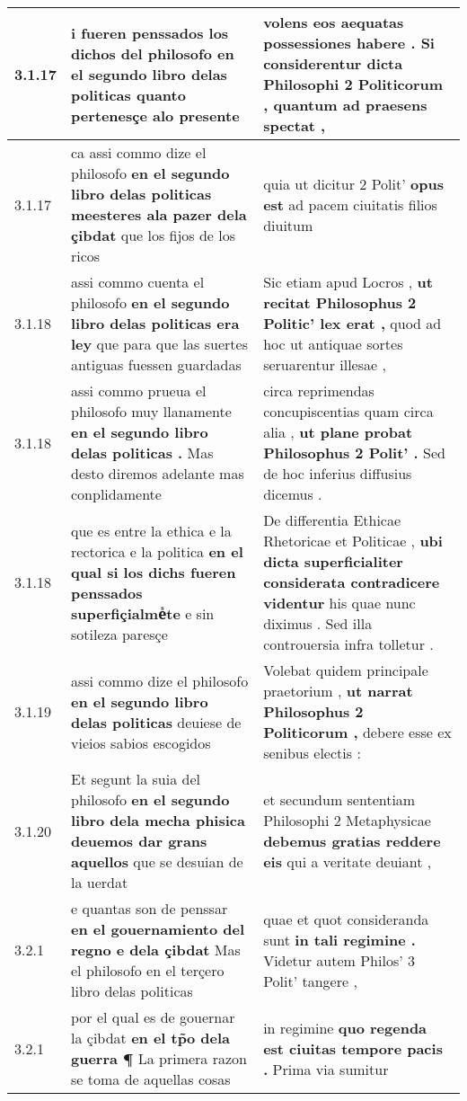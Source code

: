 \begin{tabular}{|p{1cm}|p{6.5cm}|p{6.5cm}|}
3.1.17 & i fueren penssados los dichos del philosofo \textbf{ en el segundo libro delas politicas } quanto pertenesçe alo presente & volens eos aequatas possessiones habere . \textbf{ Si considerentur dicta Philosophi 2 Politicorum , } quantum ad praesens spectat , \\\hline
3.1.17 & ca assi commo dize el philosofo \textbf{ en el segundo libro delas politicas meesteres ala pazer dela çibdat } que los fijos de los ricos & quia ut dicitur 2 Polit’ \textbf{ opus est } ad pacem ciuitatis filios diuitum \\\hline
3.1.18 & assi commo cuenta el philosofo \textbf{ en el segundo libro delas politicas era ley } que para que las suertes antiguas fuessen guardadas & Sic etiam apud Locros , \textbf{ ut recitat Philosophus 2 Politic’ lex erat , } quod ad hoc ut antiquae sortes seruarentur illesae , \\\hline
3.1.18 & assi commo prueua el philosofo muy llanamente \textbf{ en el segundo libro delas politicas . } Mas desto diremos adelante mas conplidamente & circa reprimendas concupiscentias quam circa alia , \textbf{ ut plane probat Philosophus 2 Polit’ . } Sed de hoc inferius diffusius dicemus . \\\hline
3.1.18 & que es entre la ethica e la rectorica e la politica \textbf{ en el qual si los dichs fueren penssados superfiçialmeᷤte } e sin sotileza paresçe & De differentia Ethicae Rhetoricae et Politicae , \textbf{ ubi dicta superficialiter considerata contradicere videntur } his quae nunc diximus . Sed illa controuersia infra tolletur . \\\hline
3.1.19 & assi commo dize el philosofo \textbf{ en el segundo libro delas politicas } deuiese de vieios sabios escogidos & Volebat quidem principale praetorium , \textbf{ ut narrat Philosophus 2 Politicorum , } debere esse ex senibus electis : \\\hline
3.1.20 & Et segunt la suia del philosofo \textbf{ en el segundo libro dela mecha phisica deuemos dar grans aquellos } que se desuian de la uerdat & et secundum sententiam Philosophi 2 Metaphysicae \textbf{ debemus gratias reddere eis } qui a veritate deuiant , \\\hline
3.2.1 & e quantas son de penssar \textbf{ en el gouernamiento del regno e dela çibdat } Mas el philosofo en el terçero libro delas politicas & quae et quot consideranda sunt \textbf{ in tali regimine . } Videtur autem Philos’ 3 Polit’ tangere , \\\hline
3.2.1 & por el qual es de gouernar la çibdat \textbf{ en el tp̃o dela guerra ¶ } La primera razon se toma de aquellas cosas & in regimine \textbf{ quo regenda est ciuitas tempore pacis . } Prima via sumitur \\\hline

\end{tabular}
